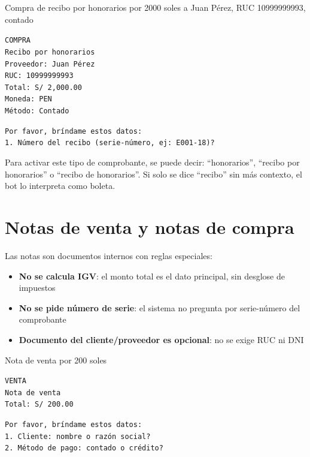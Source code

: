 \documentclass[12pt,a4paper]{article}
\begin{document}
\begin{mensajeusuario}
Compra de recibo por honorarios por 2000 soles a Juan P\'erez, RUC 10999999993, contado
\end{mensajeusuario}

\begin{mensajebot}
\texttt{COMPRA} \\
\texttt{Recibo por honorarios} \\
\texttt{Proveedor: Juan P\'erez} \\
\texttt{RUC: 10999999993} \\
\texttt{Total: S/ 2,000.00} \\
\texttt{Moneda: PEN} \\
\texttt{M\'etodo: Contado}

\medskip
\texttt{Por favor, br\'indame estos datos:} \\
\texttt{1. N\'umero del recibo (serie-n\'umero, ej: E001-18)?}
\end{mensajebot}

Para activar este tipo de comprobante, se puede decir: ``honorarios'', ``recibo por honorarios'' o ``recibo de honorarios''. Si solo se dice ``recibo'' sin m\'as contexto, el bot lo interpreta como boleta.

\section{Notas de venta y notas de compra}

Las notas son documentos internos con reglas especiales:

\begin{itemize}
    \item \textbf{No se calcula IGV}: el monto total es el dato principal, sin desglose de impuestos
    \item \textbf{No se pide n\'umero de serie}: el sistema no pregunta por serie-n\'umero del comprobante
    \item \textbf{Documento del cliente/proveedor es opcional}: no se exige RUC ni DNI
\end{itemize}

\begin{mensajeusuario}
Nota de venta por 200 soles
\end{mensajeusuario}

\begin{mensajebot}
\texttt{VENTA} \\
\texttt{Nota de venta} \\
\texttt{Total: S/ 200.00}

\medskip
\texttt{Por favor, br\'indame estos datos:} \\
\texttt{1. Cliente: nombre o raz\'on social?} \\
\texttt{2. M\'etodo de pago: contado o cr\'edito?}
\end{mensajebot}
\end{document}
